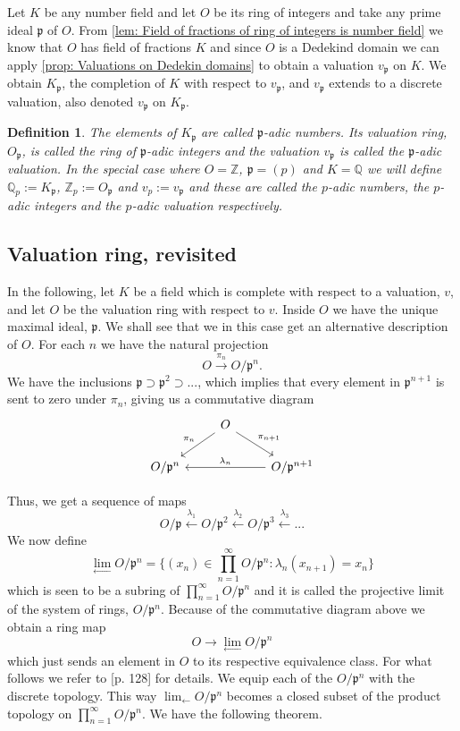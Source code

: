 \documentclass{article}
\newtheorem{definition}{Definition}[section]
\newcommand{\mfrak}[1]{\mathfrak{#1}}
\newcommand{\mbb}[1]{\mathbb{#1}}
\newcommand{\vp}{{v_{\mfrak p}}}
\numberwithin{equation}{section}
\begin{document}
Let $K$ be any number field and let $O$ be its ring of integers and take any prime ideal $\mfrak p$ of $O$. From 
\cref{lem: Field of fractions of ring of integers is number field} we know that $O$ has field of fractions $K$ and since $O$ is a Dedekind domain we can apply \cref{prop: Valuations on Dedekin domains} to obtain a valuation $\vp$ on $K$. We obtain $K_\mfrak p$, the completion of $K$ with respect to $\vp$, and $\vp$ extends to a discrete valuation, also denoted $\vp$ on $K_\mfrak p$.

\begin{definition}\label{def: P-adic numbers}
The elements of $K_\mfrak p$ are called $\mfrak p$-adic numbers. Its valuation ring, $O_\mfrak p$, is called the ring of $\mfrak p$-adic integers and the valuation $\vp$ is called the $\mfrak p$-adic valuation. In the special case where $O = \mbb Z$, $\mfrak p = (p)$ and $K = \mbb Q$ we will define $\mbb Q_p := K_\mfrak p$, $\mbb Z_p := O_\mfrak p$ and $v_p := \vp$ and these are called the $p$-adic numbers, the $p$-adic integers and the $p$-adic valuation respectively.
\end{definition}  

\subsection{Valuation ring, revisited}\label{sec: Revisit the valuation ring}
In the following, let $K$ be a field which is complete with respect to a valuation, $v$, and let $O$ be the valuation ring with respect to $v$. Inside $O$ we have the unique maximal ideal, $\mfrak p$. We shall see that we in this case get an alternative description of $O$. For each $n$ we have the natural projection
$$O \xrightarrow{\pi_n} O / \mfrak p^n.$$
We have the inclusions $\mfrak p \supset \mfrak p^2 \supset ...$, which implies that every element in $\mfrak p^{n+1}$ is sent to zero under $\pi_n$, giving us a commutative diagram
$$\begin{tikzcd}
        & O \arrow[ld, "\pi_{n}"'] \arrow[rd, "\pi_{n+1}"] & \\
        O / \mfrak p^{n} & & O / \mfrak p^{n+1} \arrow[ll, "\lambda_{n}"']
    \end{tikzcd}$$

Thus, we get a sequence of maps
$$O / \mfrak p \xleftarrow {\lambda_1} O / \mfrak p^2 \xleftarrow {\lambda_2} O / \mfrak p^3 \xleftarrow {\lambda_3} ...$$
We now define
$$\lim_{\leftarrow} O / \mfrak p^n = \{ (x_n) \in \prod_{n=1}^\infty O / \mfrak p^n : \lambda_n(x_{n+1}) = x_n \}$$
which is seen to be a subring of $\prod_{n=1}^\infty O / \mfrak p^n$ and it is called the projective limit of the system of rings, $O / \mfrak p^n$. Because of the commutative diagram above we obtain a ring map
$$O \to \lim_{\leftarrow} O / \mfrak p^n$$
which just sends an element in $O$ to its respective equivalence class. For what follows we refer to \citep{neukirch}[p. 128] for details. We equip each of the $O / \mfrak p^n$ with the discrete topology. This way $\lim_{\leftarrow} O / \mfrak p^n$ becomes a closed subset of the product topology on $\prod_{n=1}^\infty O / \mfrak p^n$. We have the following theorem.
\end{document}
